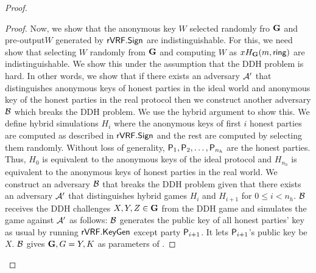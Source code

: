 \begin{proof}
\begin{proof}
			Now, we show that the anonymous key $ W $ selected randomly fro $ {\mathbf{G}} $ and pre-output$	 W $ generated by $ {\mathsf{rVRF}}.{\mathsf{Sign}} $ are indistinguishable. For this,  we need show that selecting $ W $ randomly from $ {\mathbf{G}} $ and computing $ W $ as $x H_{\mathbf{G}}(m, \mathsf{ring}) $ are indistinguishable.
			We  show this under the assumption that the DDH problem  is hard.  In other words, we show that if there exists an adversary $ \mathcal{A}' $ that distinguishes anonymous keys of honest parties in the ideal world and anonymous key of the honest parties in the real protocol then we construct another adversary $ \mathcal{B} $ which breaks the DDH problem. 
			We use the hybrid argument to show this.
			We define hybrid simulations $ H_{i} $ where  the anonymous keys of first $ i $ honest parties are computed as described in $ {\mathsf{rVRF}}.{\mathsf{Sign}} $ and the rest are computed by selecting them randomly. Without loss of generality, $ \mathsf{P}_1, \mathsf{P}_2, \ldots, \mathsf{P}_{n_h} $ are the honest parties. Thus, $ H_0 $ is equivalent to the anonymous keys of the ideal protocol  and $ H_{n_h}  $ is equivalent to the anonymous keys of honest parties in the real world.  We construct an adversary $ \mathcal{B} $ that breaks the DDH problem given that there exists an adversary $ \mathcal{A}' $ that distinguishes hybrid games $ H_i $ and $ H_{i + 1} $ for $ 0 \leq i < n_h $. $\mathcal{B} $ receives the DDH challenges $ X,Y, Z \in {\mathbf{G}} $ from the DDH game and simulates the game against $ \mathcal{A}' $ as follows: $\mathcal{B} $ generates the public key of all  honest parties' key as usual by running $ {\mathsf{rVRF}}.{\mathsf{KeyGen}}$ except party $ \mathsf{P}_{i+1} $. It lets $ \mathsf{P}_{i+1} $'s public key be $ X $. $ \mathcal{B} $ gives $ {\mathbf{G}}, G = Y, K $ as parameters of \name. 
			
			

\end{proof}
\end{proof}
